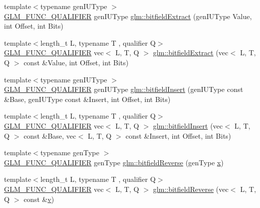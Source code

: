 \begin{DoxyCompactItemize}
\item 
{\footnotesize template$<$typename gen\+I\+U\+Type $>$ }\\\mbox{\hyperlink{setup_8hpp_a33fdea6f91c5f834105f7415e2a64407}{G\+L\+M\+\_\+\+F\+U\+N\+C\+\_\+\+Q\+U\+A\+L\+I\+F\+I\+ER}} gen\+I\+U\+Type \mbox{\hyperlink{namespaceglm_ab781f965cc1130fc70a0a8aaf50e6813}{glm\+::bitfield\+Extract}} (gen\+I\+U\+Type Value, int Offset, int Bits)
\item 
{\footnotesize template$<$length\+\_\+t L, typename T , qualifier Q$>$ }\\\mbox{\hyperlink{setup_8hpp_a33fdea6f91c5f834105f7415e2a64407}{G\+L\+M\+\_\+\+F\+U\+N\+C\+\_\+\+Q\+U\+A\+L\+I\+F\+I\+ER}} vec$<$ L, T, Q $>$ \mbox{\hyperlink{group__core__func__integer_ga346b25ab11e793e91a4a69c8aa6819f2}{glm\+::bitfield\+Extract}} (vec$<$ L, T, Q $>$ const \&Value, int Offset, int Bits)
\item 
{\footnotesize template$<$typename gen\+I\+U\+Type $>$ }\\\mbox{\hyperlink{setup_8hpp_a33fdea6f91c5f834105f7415e2a64407}{G\+L\+M\+\_\+\+F\+U\+N\+C\+\_\+\+Q\+U\+A\+L\+I\+F\+I\+ER}} gen\+I\+U\+Type \mbox{\hyperlink{namespaceglm_acec32bd3c6eb5719c5aea5b423085ae6}{glm\+::bitfield\+Insert}} (gen\+I\+U\+Type const \&Base, gen\+I\+U\+Type const \&Insert, int Offset, int Bits)
\item 
{\footnotesize template$<$length\+\_\+t L, typename T , qualifier Q$>$ }\\\mbox{\hyperlink{setup_8hpp_a33fdea6f91c5f834105f7415e2a64407}{G\+L\+M\+\_\+\+F\+U\+N\+C\+\_\+\+Q\+U\+A\+L\+I\+F\+I\+ER}} vec$<$ L, T, Q $>$ \mbox{\hyperlink{group__core__func__integer_ga2e82992340d421fadb61a473df699b20}{glm\+::bitfield\+Insert}} (vec$<$ L, T, Q $>$ const \&Base, vec$<$ L, T, Q $>$ const \&Insert, int Offset, int Bits)
\item 
{\footnotesize template$<$typename gen\+Type $>$ }\\\mbox{\hyperlink{setup_8hpp_a33fdea6f91c5f834105f7415e2a64407}{G\+L\+M\+\_\+\+F\+U\+N\+C\+\_\+\+Q\+U\+A\+L\+I\+F\+I\+ER}} gen\+Type \mbox{\hyperlink{namespaceglm_abaf011115ec2807a589806911d97c10e}{glm\+::bitfield\+Reverse}} (gen\+Type \mbox{\hyperlink{_s_d_l__opengl_8h_ad0e63d0edcdbd3d79554076bf309fd47}{x}})
\item 
{\footnotesize template$<$length\+\_\+t L, typename T , qualifier Q$>$ }\\\mbox{\hyperlink{setup_8hpp_a33fdea6f91c5f834105f7415e2a64407}{G\+L\+M\+\_\+\+F\+U\+N\+C\+\_\+\+Q\+U\+A\+L\+I\+F\+I\+ER}} vec$<$ L, T, Q $>$ \mbox{\hyperlink{group__core__func__integer_ga750a1d92464489b7711dee67aa3441b6}{glm\+::bitfield\+Reverse}} (vec$<$ L, T, Q $>$ const \&\mbox{\hyperlink{_s_d_l__opengl_8h_a10a82eabcb59d2fcd74acee063775f90}{v}})

\end{DoxyCompactItemize}
